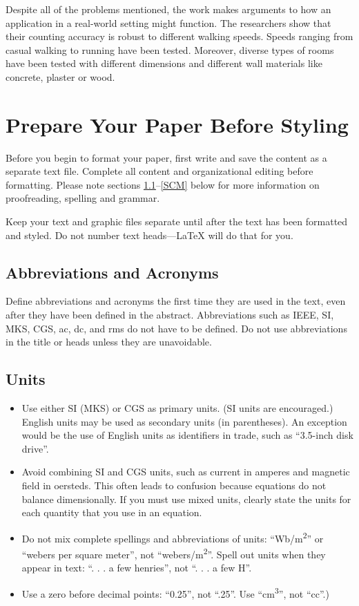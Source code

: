 \documentclass[conference]{IEEEtran}
\begin{document}
Despite all of the problems mentioned, the work makes arguments to how an application in a real-world setting might function. The researchers show that their counting accuracy is robust to different walking speeds. Speeds ranging from casual walking to running have been tested. Moreover, diverse types of rooms have been tested with different dimensions and different wall materials like concrete, plaster or wood.

\section{Prepare Your Paper Before Styling}
Before you begin to format your paper, first write and save the content as a 
separate text file. Complete all content and organizational editing before 
formatting. Please note sections \ref{AA}--\ref{SCM} below for more information on 
proofreading, spelling and grammar.

Keep your text and graphic files separate until after the text has been 
formatted and styled. Do not number text heads---{\LaTeX} will do that 
for you.

\subsection{Abbreviations and Acronyms}\label{AA}
Define abbreviations and acronyms the first time they are used in the text, 
even after they have been defined in the abstract. Abbreviations such as 
IEEE, SI, MKS, CGS, ac, dc, and rms do not have to be defined. Do not use 
abbreviations in the title or heads unless they are unavoidable.

\subsection{Units}
\begin{itemize}
\item Use either SI (MKS) or CGS as primary units. (SI units are encouraged.) English units may be used as secondary units (in parentheses). An exception would be the use of English units as identifiers in trade, such as ``3.5-inch disk drive''.
\item Avoid combining SI and CGS units, such as current in amperes and magnetic field in oersteds. This often leads to confusion because equations do not balance dimensionally. If you must use mixed units, clearly state the units for each quantity that you use in an equation.
\item Do not mix complete spellings and abbreviations of units: ``Wb/m\textsuperscript{2}'' or ``webers per square meter'', not ``webers/m\textsuperscript{2}''. Spell out units when they appear in text: ``. . . a few henries'', not ``. . . a few H''.
\item Use a zero before decimal points: ``0.25'', not ``.25''. Use ``cm\textsuperscript{3}'', not ``cc''.)
\end{itemize}
\end{document}
